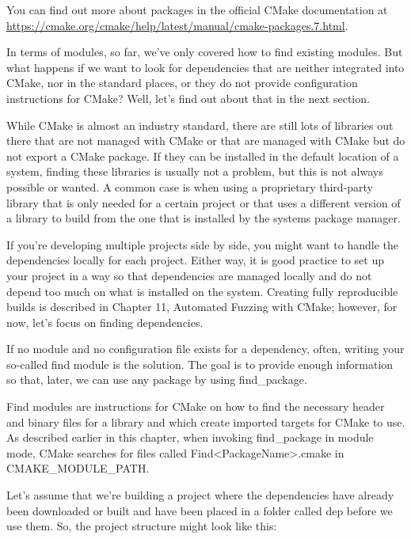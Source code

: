 You can find out more about packages in the official CMake documentation at \url{https://cmake.org/cmake/help/latest/manual/cmake-packages.7.html}.

In terms of modules, so far, we've only covered how to find existing modules. But what happens if we want to look for dependencies that are neither integrated into CMake, nor in the standard places, or they do not provide configuration instructions for CMake? Well, let's find out about that in the next section.


While CMake is almost an industry standard, there are still lots of libraries out there that are not managed with CMake or that are managed with CMake but do not export a CMake package. If they can be installed in the default location of a system, finding these libraries is usually not a problem, but this is not always possible or wanted. A common case is when using a proprietary third-party library that is only needed for a certain project or that uses a different version of a library to build from the one that is installed by the systems package manager.

If you're developing multiple projects side by side, you might want to handle the dependencies locally for each project. Either way, it is good practice to set up your project in a way so that dependencies are managed locally and do not depend too much on what is installed on the system. Creating fully reproducible builds is described in Chapter 11, Automated Fuzzing with CMake; however, for now, let's focus on finding dependencies. 

If no module and no configuration file exists for a dependency, often, writing your so-called find module is the solution. The goal is to provide enough information so that, later, we can use any package by using find\_package.

Find modules are instructions for CMake on how to find the necessary header and binary files for a library and which create imported targets for CMake to use. As described earlier in this chapter, when invoking find\_package in module mode, CMake searches for files called Find<PackageName>.cmake in CMAKE\_MODULE\_PATH.

Let's assume that we're building a project where the dependencies have already been downloaded or built and have been placed in a folder called dep before we use them. So, the project structure might look like this:

